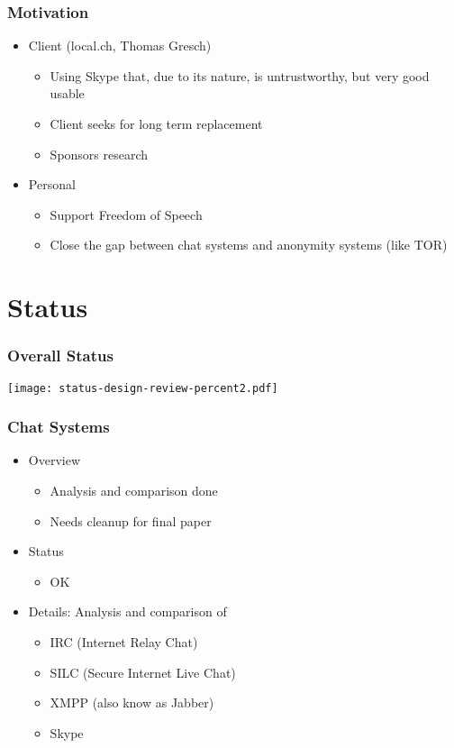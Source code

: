 \documentclass{beamer}
\begin{document}
\frame
{
  \frametitle{Motivation}
  \begin{itemize}
     \item Client (local.ch, Thomas Gresch)
     \begin{itemize}
        \item Using Skype that, due to its nature, is untrustworthy, but very good usable
        \item Client seeks for long term replacement 
        \item Sponsors research
    \end{itemize}
     \item Personal
     \begin{itemize}
        \item Support Freedom of Speech
        \item Close the gap between chat systems and anonymity systems (like TOR)
    \end{itemize}
  \end{itemize}
}

\section{Status}
\frame
{
  \frametitle{Overall Status}
  
  \begin{center}
   \texttt{[image: status-design-review-percent2.pdf]}
  \end{center}
}


\frame
{
  \frametitle{Chat Systems}
  \begin{itemize}
     \item Overview
      \begin{itemize}
          \item Analysis and comparison done
          \item Needs cleanup for final paper
      \end{itemize}
      \item Status
      \begin{itemize}
          \item OK
      \end{itemize}
      \pause \item Details: Analysis and comparison of
      \begin{itemize}
          \item IRC (Internet Relay Chat)
          \item SILC (Secure Internet Live Chat)
          \item XMPP (also know as Jabber)
          \item Skype
      \end{itemize}
   \end{itemize}
}
\end{document}
